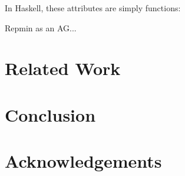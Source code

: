 \documentclass[runningheads]{llncs}
\begin{document}
  In Haskell, these attributes are simply functions:

  Repmin as an AG...

\section{Related Work}\label{sec:related-work}

\section{Conclusion}\label{sec:conclusion}

\section*{Acknowledgements}



\end{document}
